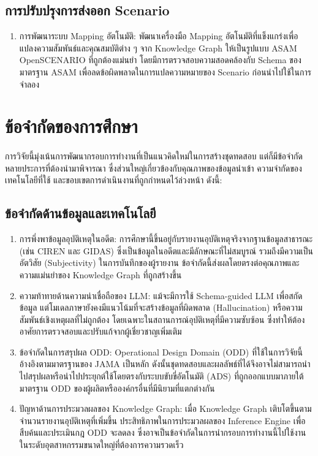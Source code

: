 \subsection{การปรับปรุงการส่งออก Scenario}\label{subsec:improving-scenario-export}

\begin{enumerate}
    \item การพัฒนาระบบ Mapping อัตโนมัติ: พัฒนาเครื่องมือ Mapping อัตโนมัติที่แข็งแกร่งเพื่อแปลงความสัมพันธ์และคุณสมบัติต่าง ๆ จาก Knowledge Graph ให้เป็นรูปแบบ ASAM OpenSCENARIO ที่ถูกต้องแม่นยำ โดยมีการตรวจสอบความสอดคล้องกับ Schema ของมาตรฐาน ASAM เพื่อลดข้อผิดพลาดในการแปลความหมายของ Scenario ก่อนนำไปใช้ในการจำลอง
\end{enumerate}

\section{ข้อจำกัดของการศึกษา}\label{sec:limitations}
\paragraph{}

การวิจัยนี้มุ่งเน้นการพัฒนากรอบการทำงานที่เป็นแนวคิดใหม่ในการสร้างชุดทดสอบ แต่ก็มีข้อจำกัดหลายประการที่ต้องนำมาพิจารณา ซึ่งส่วนใหญ่เกี่ยวข้องกับคุณภาพของข้อมูลนำเข้า ความจำกัดของเทคโนโลยีที่ใช้ และขอบเขตการดำเนินงานที่ถูกกำหนดไว้ล่วงหน้า ดังนี้:

\subsection{ข้อจำกัดด้านข้อมูลและเทคโนโลยี}\label{subsec:data-tech-limitations}

\begin{enumerate}
    \item การพึ่งพาข้อมูลอุบัติเหตุในอดีต: การศึกษานี้ขึ้นอยู่กับรายงานอุบัติเหตุจริงจากฐานข้อมูลสาธารณะ (เช่น CIREN และ GIDAS) ซึ่งเป็นข้อมูลในอดีตและมีลักษณะที่ไม่สมบูรณ์ รวมถึงมีความเป็นอัตวิสัย (Subjectivity) ในการบันทึกของผู้รายงาน ข้อจำกัดนี้ส่งผลโดยตรงต่อคุณภาพและความแม่นยำของ Knowledge Graph ที่ถูกสร้างขึ้น
    \item ความท้าทายด้านความน่าเชื่อถือของ LLM: แม้จะมีการใช้ Schema-guided LLM เพื่อสกัดข้อมูล แต่โมเดลภาษายังคงมีแนวโน้มที่จะสร้างข้อมูลที่ผิดพลาด (Hallucination) หรือความสัมพันธ์เชิงเหตุผลที่ไม่ถูกต้อง โดยเฉพาะในสถานการณ์อุบัติเหตุที่มีความซับซ้อน ซึ่งทำให้ต้องอาศัยการตรวจสอบและปรับแก้จากผู้เชี่ยวชาญเพิ่มเติม
    \item ข้อจำกัดในการสรุปผล ODD: Operational Design Domain (ODD) ที่ใช้ในการวิจัยนี้อ้างอิงตามมาตรฐานของ JAMA เป็นหลัก ดังนั้นชุดทดสอบและผลลัพธ์ที่ได้จึงอาจไม่สามารถนำไปสรุปผลหรือนำไปประยุกต์ใช้โดยตรงกับระบบขับขี่อัตโนมัติ (ADS) ที่ถูกออกแบบมาภายใต้มาตรฐาน ODD ของผู้ผลิตหรือองค์กรอื่นที่มีนิยามที่แตกต่างกัน
    \item ปัญหาด้านการประมวลผลของ Knowledge Graph: เมื่อ Knowledge Graph เติบโตขึ้นตามจำนวนรายงานอุบัติเหตุที่เพิ่มขึ้น ประสิทธิภาพในการประมวลผลของ Inference Engine เพื่อสืบค้นและประเมินกฎ ODD จะลดลง ซึ่งอาจเป็นข้อจำกัดในการนำกรอบการทำงานนี้ไปใช้งานในระดับอุตสาหกรรมขนาดใหญ่ที่ต้องการความรวดเร็ว
\end{enumerate}

